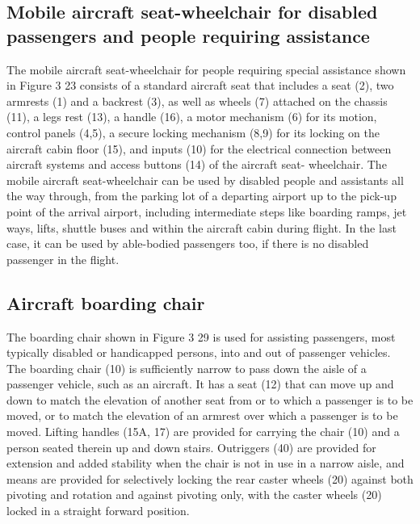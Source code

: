 \documentclass[a4paper, 12pt,conference]{new_cit_thesis}
\begin{document}
\subsection{Mobile aircraft seat-wheelchair for disabled passengers and people requiring assistance}
The mobile aircraft seat-wheelchair for people requiring special assistance shown in Figure 3 23 consists of a standard aircraft seat that includes a seat (2), two armrests (1) and a backrest (3), as well as wheels (7) attached on the chassis (11), a legs rest (13), a handle (16), a motor mechanism (6) for its motion, control panels (4,5), a secure locking mechanism (8,9) for its locking on the aircraft cabin floor (15), and inputs (10) for the electrical connection between aircraft systems and access buttons (14) of the aircraft seat- wheelchair. The mobile aircraft seat-wheelchair can be used by disabled people and assistants all the way through, from the parking lot of a departing airport up to the pick-up point of the arrival airport, including intermediate steps like boarding ramps, jet ways, lifts, shuttle buses and within the aircraft cabin during flight. In the last case, it can be used by able-bodied passengers too, if there is no disabled passenger in the flight. 

\subsection{Aircraft boarding chair}
The boarding chair shown in Figure 3 29 is used for assisting passengers, most typically disabled or handicapped persons, into and out of passenger vehicles. The boarding chair (10) is sufficiently narrow to pass down the aisle of a passenger vehicle, such as an aircraft. It has a seat (12) that can move up and down to match the elevation of another seat from or to which a passenger is to be moved, or to match the elevation of an armrest over which a passenger is to be moved. Lifting handles (15A, 17) are provided for carrying the chair (10) and a person seated therein up and down stairs. Outriggers (40) are provided for extension and added stability when the chair is not in use in a narrow aisle, and means are provided for selectively locking the rear caster wheels (20) against both pivoting and rotation and against pivoting only, with the caster wheels (20) locked in a straight forward position. 
\end{document}
